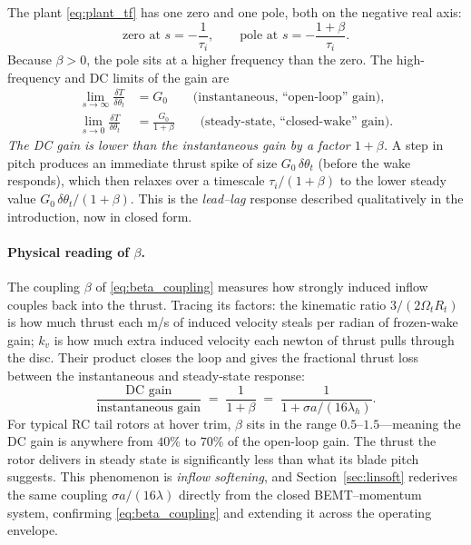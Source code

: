 \documentclass[11pt,a4paper]{article}
\newcommand{\OmegaT}{\Omega_t}
\newcommand{\Rt}{R_t}
\newcommand{\thetat}{\theta_t}
\begin{document}
The plant \eqref{eq:plant_tf} has one zero and one pole, both on the
negative real axis:
\begin{equation}
\text{zero at }s=-\frac{1}{\tau_i},
\qquad
\text{pole at }s=-\frac{1+\beta}{\tau_i}.
\end{equation}
Because \(\beta > 0\), the pole sits at a higher frequency than the zero.
The high-frequency and DC limits of the gain are
\begin{align}
\lim_{s\to\infty} \frac{\delta T}{\delta\thetat}
 &= G_0
 \qquad\text{(instantaneous, ``open-loop'' gain)},\\
\lim_{s\to 0} \frac{\delta T}{\delta\thetat}
 &= \frac{G_0}{1+\beta}
 \qquad\text{(steady-state, ``closed-wake'' gain)}.
\end{align}
\emph{The DC gain is lower than the instantaneous gain by a factor
\(1+\beta\).} A step in pitch produces an immediate thrust spike of size
\(G_0\,\delta\thetat\) (before the wake responds), which then relaxes
over a timescale \(\tau_i/(1+\beta)\) to the lower steady value
\(G_0\,\delta\thetat/(1+\beta)\). This is the \emph{lead--lag} response
described qualitatively in the introduction, now in closed form.

\paragraph{Physical reading of \(\beta\).}
The coupling \(\beta\) of \eqref{eq:beta_coupling} measures how strongly
induced inflow couples back into the thrust. Tracing its factors: the
kinematic ratio \(3/(2\OmegaT\Rt)\) is how much thrust each m/s of
induced velocity steals per radian of frozen-wake gain; \(k_v\) is how
much extra induced velocity each newton of thrust pulls through the disc.
Their product closes the loop and gives the fractional thrust loss
between the instantaneous and steady-state response:
\begin{equation}
\frac{\text{DC gain}}{\text{instantaneous gain}}
   \;=\; \frac{1}{1+\beta}
   \;=\; \frac{1}{1+\sigma a/(16\lambda_h)}.
\end{equation}
For typical RC tail rotors at hover trim, \(\beta\) sits in the range
\(0.5\)--\(1.5\)---meaning the DC gain is anywhere from \(40\%\) to
\(70\%\) of the open-loop gain. The thrust the rotor delivers in steady
state is significantly less than what its blade pitch suggests. This
phenomenon is \emph{inflow softening}, and Section~\ref{sec:linsoft}
rederives the same coupling \(\sigma a/(16\lambda)\) directly from the
closed BEMT--momentum system, confirming \eqref{eq:beta_coupling} and
extending it across the operating envelope.
\end{document}
